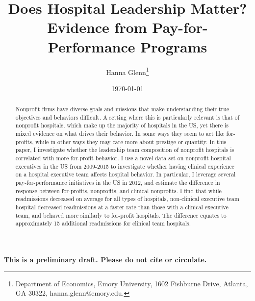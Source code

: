 \documentclass[12pt]{article}
\begin{document}
	
	
	
	
	\linespread{1.2}\title{\vspace{-0.5in} Does Hospital Leadership Matter?\\ \large Evidence from Pay-for-Performance Programs} 
	
	\date{\today}
	
	\author{\vspace{10mm}Hanna Glenn\footnote{Department of Economics, Emory University, 1602 Fishburne Drive, Atlanta, GA 30322, hanna.glenn@emory.edu.} }
	
	\maketitle
	
	\vspace{-0.2in}
	
	\singlespacing\maketitle

    \begin{center}
    \large
    \textbf{This is a preliminary draft. Please do not cite or circulate.}
	\end{center}

 \vspace{3mm}
	
    \begin{abstract}
		{\small
        Nonprofit firms have diverse goals and missions that make understanding their true objectives and behaviors difficult. A setting where this is particularly relevant is that of nonprofit hospitals, which make up the majority of hospitals in the US, yet there is mixed evidence on what drives their behavior. In some ways they seem to act like for-profits, while in other ways they may care more about prestige or quantity. In this paper, I investigate whether the leadership team composition of nonprofit hospitals is correlated with more for-profit behavior. I use a novel data set on nonprofit hospital executives in the US from 2009-2015 to investigate whether having clinical experience on a hospital executive team affects hospital behavior. In particular, I leverage several pay-for-performance initiatives in the US in 2012, and estimate the difference in response between for-profits, nonprofits, and clinical nonprofits. I find that while readmissions decreased on average for all types of hospitals, non-clinical executive team hospital decreased readmissions at a faster rate than those with a clinical executive team, and behaved more similarly to for-profit hospitals. The difference equates to approximately 15 additional readmissions for clinical team hospitals. 
			
		} 
	\end{abstract}
	
\end{document}
